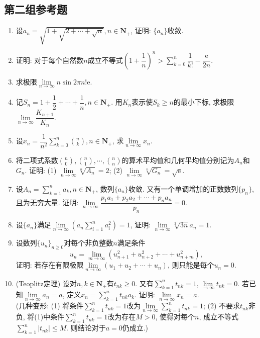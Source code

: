 \documentclass[a4paper,11pt,twoside]{ctexbook}
\newcommand{\e}{\mathrm e}
\begin{document}
\subsection{第二组参考题}
\begin{enumerate}
	\item 设$a_n=\sqrt{1+\sqrt{2+\cdots+\sqrt{n}}}, n\in\mathbf{N}_{+}$, 证明: $\{a_n\}$收敛.

	\item 证明: 对于每个自然数$n$成立不等式$\left(1+\dfrac{1}{n}\right)^n>\sum\limits_{k=0}^n\dfrac{1}{k!}-\dfrac{\e}{2n}$.

	\item 求极限$\lim\limits_{n\to\infty} n\sin{2\pi n!\e}$.

	\item 记$S_n=1+\dfrac{1}{2}+\cdots+\dfrac{1}{n}, n\in\mathbf{N}_{+}$. 用$K_n$表示使$S_k\geqslant n$的最小下标, 求极限$\lim\limits_{n\to\infty} \dfrac{K_{n+1}}{K_n}$.

	\item 设$x_n=\dfrac{1}{n^2}\displaystyle\sum\limits_{k=0}^n\binom{n}{k}, n\in\mathbf{N}_{+}$, 求$\lim\limits_{n\to\infty} x_n$.

	\item 将二项式系数$\displaystyle\binom{n}{0}, \binom{n}{1}, \cdots, \binom{n}{n}$的算术平均值和几何平均值分别记为$A_n$和$G_n$. 证明: (1) $\lim\limits_{n\to\infty} \sqrt[n]{A_n}=2$; (2) $\lim\limits_{n\to\infty} \sqrt[n]{G_n}=\sqrt{\e}$.

	\item 设$A_n=\displaystyle\sum\limits_{k=1}^n a_k, n\in\mathbf{N}_{+}$, 数列$\{a_n\}$收敛. 又有一个单调增加的正数数列$\{p_n\}$, 且为无穷大量. 证明: $\lim\limits_{n\to\infty} \dfrac{p_1a_1+p_2a_2+\cdots+p_na_n}{p_n}=0$.

	\item 设$\{a_n\}$满足$\lim\limits_{n\to\infty} (a_n\displaystyle\sum_{i=1}^n a_i^2)=1$, 证明: $\lim\limits_{n\to\infty} \sqrt[3]{3n} a_n=1$.

	\item 设数列$\{u_n\}_{n\geqslant 0}$对每个非负整数$n$满足条件
	      \[
		      u_n=\lim\limits_{m\to\infty} (u_{n+1}^2+u_{n+2}^2+\cdots+u_{n+m}^2),
	      \]
	      证明: 若存在有限极限$\lim\limits_{n\to\infty} (u_1+u_2+\cdots+u_n)$, 则只能是每个$u_n=0$.

	\item (Teoplitz定理) 设对$n,k\in\mathbf{N}_{+}$有$t_{nk}\geqslant 0$. 又有$\displaystyle\sum\limits_{k=1}^n t_{nk}=1, \lim\limits_{\to\infty} t_{nk}=0$. 若已知$\lim\limits_{n\to\infty} a_n=a$, 定义$x_n=\displaystyle\sum\limits_{k=1}^nt_{nk}a_k$. 证明: $\lim\limits_{n\to\infty} x_n=a$.\\
	      (几种变形: (1) 将条件$\displaystyle\sum\limits_{k=1}^n t_{nk}=1$改为$\lim\limits_{n\to\infty} \displaystyle\sum\limits_{k=1}^n t_{nk}=1$; (2) 不要求$t_{nk}$非负, 将(1)中条件$\displaystyle\sum\limits_{k=1}^n t_{nk}=1$改为存在$M>0$, 使得对每个$n$, 成立不等式$\displaystyle\sum\limits_{k=1}^n|t_{nk}|\leqslant M$. 则结论对于$a=0$仍成立.)


\end{enumerate}
\end{document}
